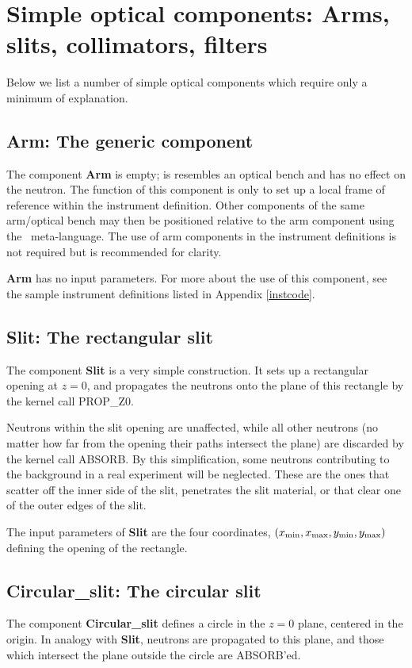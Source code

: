 
\chapter{Simple optical components:
Arms, slits, collimators, filters}
Below we list a number of simple optical components 
which require only a minimum of explanation.

\section{Arm: The generic component}
\label{explain:arm}
The component {\bf Arm} is empty; is resembles an optical bench
and has no effect on the neutron.
The function of this component is only to set up a local frame of
reference within the instrument definition. Other components of the
same arm/optical bench may then be
positioned relative to the arm component
using the \MCS\ meta-language.
The use of arm components in the instrument definitions
is not required but is recommended for clarity.

{\bf Arm} has no input parameters.
For more about the use of this component, see the 
sample instrument definitions listed in Appendix \ref{instcode}.


\section{Slit: The rectangular slit}
\label{slit}
The component {\bf Slit} is a very simple construction.
It sets up a rectangular opening at $z=0$, and propagates the neutrons 
onto the plane of this rectangle by the kernel call PROP\_Z0.

Neutrons within the slit opening are unaffected, 
while all other neutrons
(no matter how far from the opening their paths intersect the plane)
are discarded by the kernel call ABSORB.
By this simplification, some neutrons contributing to the background
in a real experiment will be neglected. 
These are the ones that scatter off the inner side
of the slit, penetrates the slit material, 
or that clear one of the outer edges of the slit.

The input parameters of {\bf Slit} are the four coordinates,
$(x_{\rm min}, x_{\rm max}, y_{\rm min}, y_{\rm max})$
defining the opening of the rectangle.

\section{Circular\_slit: The circular slit}
The component {\bf Circular\_slit} defines a circle in the $z=0$ plane,
centered in the origin. In analogy with {\bf Slit},
neutrons are propagated to this plane, and those which intersect
the plane outside the circle are ABSORB'ed.

